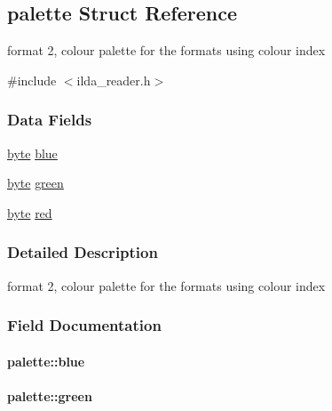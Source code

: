 \hypertarget{structpalette}{}\subsection{palette Struct Reference}
\label{structpalette}


format 2, colour palette for the formats using colour index  




{\ttfamily \#include $<$ilda\+\_\+reader.\+h$>$}

\subsubsection*{Data Fields}
\begin{DoxyCompactItemize}
\item 
\hyperlink{ilda__reader_8h_a0c8186d9b9b7880309c27230bbb5e69d}{byte} \hyperlink{structpalette_af572ea74d0b7cae592894591ec7c2d00}{blue}
\item 
\hyperlink{ilda__reader_8h_a0c8186d9b9b7880309c27230bbb5e69d}{byte} \hyperlink{structpalette_a5063d35ce5e5623bc9bdfc75280f800b}{green}
\item 
\hyperlink{ilda__reader_8h_a0c8186d9b9b7880309c27230bbb5e69d}{byte} \hyperlink{structpalette_a4ddb05dff589a890711966e7774e75d2}{red}
\end{DoxyCompactItemize}


\subsubsection{Detailed Description}
format 2, colour palette for the formats using colour index 

\subsubsection{Field Documentation}
\paragraph[{\texorpdfstring{blue}{blue}}]{ palette\+::blue}\hypertarget{structpalette_af572ea74d0b7cae592894591ec7c2d00}{}\label{structpalette_af572ea74d0b7cae592894591ec7c2d00}
\paragraph[{\texorpdfstring{green}{green}}]{ palette\+::green}\hypertarget{structpalette_a5063d35ce5e5623bc9bdfc75280f800b}{}\label{structpalette_a5063d35ce5e5623bc9bdfc75280f800b}
